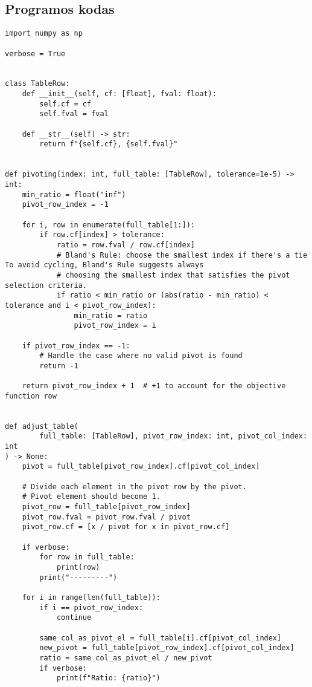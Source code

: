 \documentclass[a4paper,12pt,fleqn]{article}
\begin{document}
\pagebreak
\subsection{Programos kodas} \label{source}
\begin{verbatim}
import numpy as np

verbose = True


class TableRow:
    def __init__(self, cf: [float], fval: float):
        self.cf = cf
        self.fval = fval

    def __str__(self) -> str:
        return f"{self.cf}, {self.fval}"


def pivoting(index: int, full_table: [TableRow], tolerance=1e-5) -> int:
    min_ratio = float("inf")
    pivot_row_index = -1

    for i, row in enumerate(full_table[1:]):
        if row.cf[index] > tolerance:
            ratio = row.fval / row.cf[index]
            # Bland's Rule: choose the smallest index if there's a tie To avoid cycling, Bland's Rule suggests always
            # choosing the smallest index that satisfies the pivot selection criteria.
            if ratio < min_ratio or (abs(ratio - min_ratio) < tolerance and i < pivot_row_index):
                min_ratio = ratio
                pivot_row_index = i

    if pivot_row_index == -1:
        # Handle the case where no valid pivot is found
        return -1

    return pivot_row_index + 1  # +1 to account for the objective function row


def adjust_table(
        full_table: [TableRow], pivot_row_index: int, pivot_col_index: int
) -> None:
    pivot = full_table[pivot_row_index].cf[pivot_col_index]

    # Divide each element in the pivot row by the pivot.
    # Pivot element should become 1.
    pivot_row = full_table[pivot_row_index]
    pivot_row.fval = pivot_row.fval / pivot
    pivot_row.cf = [x / pivot for x in pivot_row.cf]

    if verbose:
        for row in full_table:
            print(row)
        print("---------")

    for i in range(len(full_table)):
        if i == pivot_row_index:
            continue

        same_col_as_pivot_el = full_table[i].cf[pivot_col_index]
        new_pivot = full_table[pivot_row_index].cf[pivot_col_index]
        ratio = same_col_as_pivot_el / new_pivot
        if verbose:
            print(f"Ratio: {ratio}")


\end{verbatim}
\end{document}
